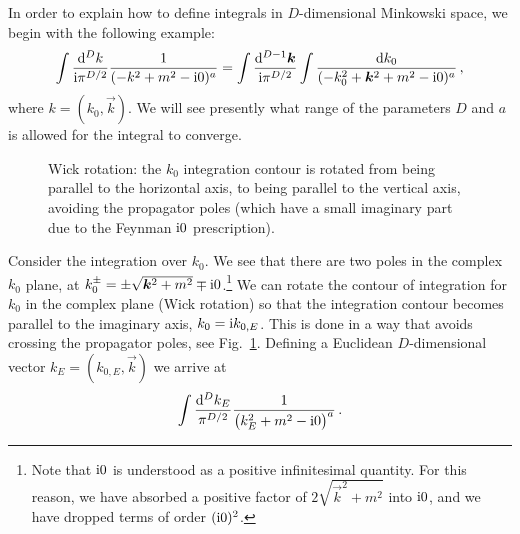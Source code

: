 In order to explain how to define integrals in $D$-dimensional Minkowski space,
we begin with the following example:
\begin{align}\label{example_propagator}
 \int \frac{\d^{D}k}{\i \pi^{D/2}}  \frac{1}{(-k^2 + m^2- \i 0)^a} =  \int \frac{\d^{D-1}\vec{k} }{\i \pi^{D/2}}  \int  \frac{\d k_{0}}{(-k_{0}^2 + \vec{k}^2 + m^2-\i 0)^a}    \,,
\end{align}
where $k = (k_0, \vec{k})$.
We will see presently what range of the parameters $D$ and $a$ is allowed for the integral to converge.
\begin{figure}[t]
\centering
{}
   \caption{Wick rotation: the $k_{0}$ integration contour is rotated from being parallel to the horizontal axis, to being parallel to the vertical axis, avoiding the propagator poles (which have a small imaginary part due to the Feynman $\mathrm{i} 0$ prescription).
} 
\label{fig:feyn0}
\end{figure}
Consider the integration over $k_{0}$. We see that there are two poles in the complex $k_{0}$ plane, at $k_{0}^\pm = \pm \sqrt{ \vec{k}^2+m^2 } \mp \i 0$.\footnote{Note that $\mathrm{i} 0$ is understood as a positive infinitesimal quantity. 
For this reason, we have absorbed a positive factor of 
$2\sqrt{ \vec{k}^2+m^2}$ into $\mathrm{i} 0$, and we have dropped terms of order $(\mathrm{i} 0)^{2}$.} We can rotate the contour of integration for $k_{0}$ in the complex plane (Wick rotation) so that the integration contour becomes  parallel to the imaginary axis, $k_{0} = \mathrm{i} k_{0,E}$.  This is done in a way that avoids crossing the propagator poles, see Fig.~\ref{fig:feyn0}.
Defining a Euclidean $D$-dimensional vector $k_E = (k_{0,E},\vec{k})$ we
arrive at
\begin{align}
 \int \frac{\mathrm{d}^{D}k_{E}}{ \pi^{D/2}}  \frac{1}{\bigl(k_{E}^2 + m^2-\mathrm{i} 0 \bigr)^a}  \,.
\end{align}
